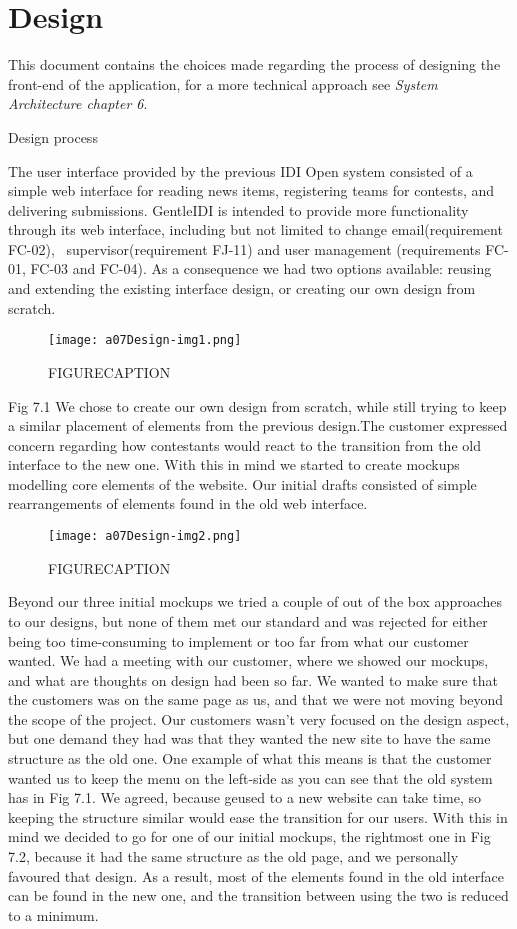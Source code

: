 \section{Design}
This document contains the choices made regarding the process of
designing the front-end of the application, for a more technical
approach see \textit{System Architecture chapter 6}.

Design process

The user interface provided by the previous IDI Open system consisted of
a simple web interface for reading news items, registering teams for
contests, and delivering submissions. GentleIDI is intended to provide
more functionality through its web interface, including but not limited
to change email(requirement FC-02), \ supervisor(requirement FJ-11) and
user management (requirements FC-01, FC-03 and FC-04). As a consequence
we had two options available: reusing and extending the existing
interface design, or creating our own design from scratch.

\begin{figure}[h!]
	\texttt{[image: a07Design-img1.png]} 
	\caption{FIGURECAPTION}
\end{figure}
Fig 7.1
We chose to create our own design from scratch, while still trying to
keep a similar placement of elements from the previous design.The
customer expressed concern regarding how contestants would react to the
transition from the old interface to the new one. With this in mind we
started to create mockups modelling core elements of the website. Our
initial drafts consisted of simple rearrangements of elements found in
the old web interface.

\begin{figure}[h!]
	\texttt{[image: a07Design-img2.png]} 
	\caption{FIGURECAPTION}
\end{figure}

Beyond our three initial mockups we tried a couple of {\textquotedbl}out
of the box{\textquotedbl} approaches to our designs, but none of them
met our standard and was rejected for either being too time-consuming
to implement or too far from what our customer wanted. We had a meeting
with our customer, where we showed our mockups, and what are thoughts
on design had been so far. We wanted to make sure that the customers
was on the same page as us, and that we were not moving beyond the
scope of the project. Our customers wasn't very focused
on the design aspect, but one demand they had was that they wanted the
new site to have the same structure as the old one. One example of what
this means is that the customer wanted us to keep the menu on the
left-side as you can see that the old system has in Fig 7.1. We agreed,
because ge\tting used to a new website can take time, so keeping the
structure similar would ease the transition for our users. With this in
mind we decided to go for one of our initial mockups, the rightmost one
in Fig 7.2, because it had the same structure as the old page, and we
personally favoured that design. As a result, most of the elements
found in the old interface can be found in the new one, and the
transition between using the two is reduced to a minimum.

